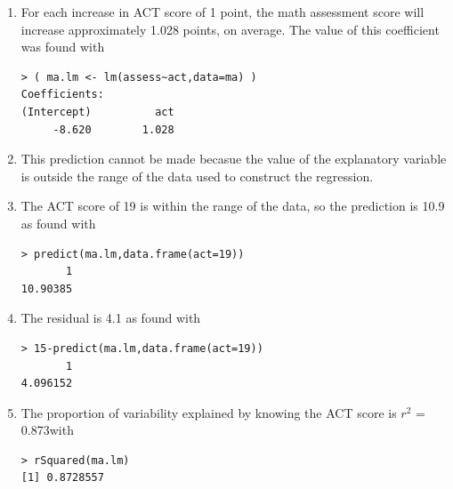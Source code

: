 \documentclass[10pt,openany]{book}\usepackage[]{graphicx}\usepackage[]{color}
\makeatletter
\newenvironment{kframe}{%
 \def\at@end@of@kframe{}%
 \ifinner\ifhmode%
  \def\at@end@of@kframe{\end{minipage}}%
  \begin{minipage}{\columnwidth}%
 \fi\fi%
 \def\FrameCommand##1{\hskip\@totalleftmargin \hskip-\fboxsep
 \colorbox{shadecolor}{##1}\hskip-\fboxsep
     \hskip-\linewidth \hskip-\@totalleftmargin \hskip\columnwidth}%
 \MakeFramed {\advance\hsize-\width
   \@totalleftmargin\z@ \linewidth\hsize
   \@setminipage}}%
 {\par\unskip\endMakeFramed%
 \at@end@of@kframe}
\newenvironment{knitrout}{}{} %
\makeatother
\begin{document}
\begin{itemize}
\begin{enumerate}
      \item For each increase in ACT score of 1 point, the math assessment score will increase approximately 1.028 points, on average.  The value of this coefficient was found with
\begin{knitrout}
\color{fgcolor}\begin{kframe}
\begin{verbatim}
> ( ma.lm <- lm(assess~act,data=ma) )
Coefficients:
(Intercept)          act  
     -8.620        1.028  
\end{verbatim}
\end{kframe}
\end{knitrout}
      \item This prediction cannot be made becasue the value of the explanatory variable is outside the range of the data used to construct the regression.
      \item The ACT score of 19 is within the range of the data, so the prediction is 10.9 as found with
\begin{knitrout}
\color{fgcolor}\begin{kframe}
\begin{verbatim}
> predict(ma.lm,data.frame(act=19))
       1 
10.90385 
\end{verbatim}
\end{kframe}
\end{knitrout}
      \item The residual is 4.1 as found with
\begin{knitrout}
\color{fgcolor}\begin{kframe}
\begin{verbatim}
> 15-predict(ma.lm,data.frame(act=19))
       1 
4.096152 
\end{verbatim}
\end{kframe}
\end{knitrout}
      \item The proportion of variability explained by knowing the ACT score is $r^{2}$ = 0.873with
\begin{knitrout}
\color{fgcolor}\begin{kframe}
\begin{verbatim}
> rSquared(ma.lm)
[1] 0.8728557
\end{verbatim}
\end{kframe}
\end{knitrout}

\end{enumerate}
\end{itemize}
\end{document}
